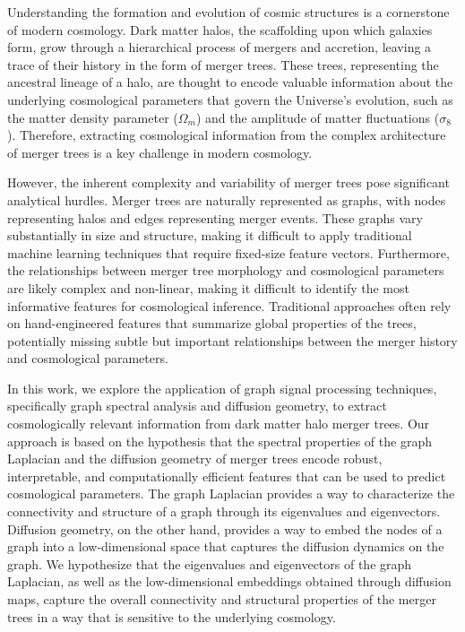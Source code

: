 \documentclass[twocolumn]{aastex631}
\begin{document}
Understanding the formation and evolution of cosmic structures is a cornerstone of modern cosmology. Dark matter halos, the scaffolding upon which galaxies form, grow through a hierarchical process of mergers and accretion, leaving a trace of their history in the form of merger trees. These trees, representing the ancestral lineage of a halo, are thought to encode valuable information about the underlying cosmological parameters that govern the Universe's evolution, such as the matter density parameter ($\Omega_m$) and the amplitude of matter fluctuations ($\sigma_8$). Therefore, extracting cosmological information from the complex architecture of merger trees is a key challenge in modern cosmology.

However, the inherent complexity and variability of merger trees pose significant analytical hurdles. Merger trees are naturally represented as graphs, with nodes representing halos and edges representing merger events. These graphs vary substantially in size and structure, making it difficult to apply traditional machine learning techniques that require fixed-size feature vectors. Furthermore, the relationships between merger tree morphology and cosmological parameters are likely complex and non-linear, making it difficult to identify the most informative features for cosmological inference. Traditional approaches often rely on hand-engineered features that summarize global properties of the trees, potentially missing subtle but important relationships between the merger history and cosmological parameters.

In this work, we explore the application of graph signal processing techniques, specifically graph spectral analysis and diffusion geometry, to extract cosmologically relevant information from dark matter halo merger trees. Our approach is based on the hypothesis that the spectral properties of the graph Laplacian and the diffusion geometry of merger trees encode robust, interpretable, and computationally efficient features that can be used to predict cosmological parameters. The graph Laplacian provides a way to characterize the connectivity and structure of a graph through its eigenvalues and eigenvectors. Diffusion geometry, on the other hand, provides a way to embed the nodes of a graph into a low-dimensional space that captures the diffusion dynamics on the graph. We hypothesize that the eigenvalues and eigenvectors of the graph Laplacian, as well as the low-dimensional embeddings obtained through diffusion maps, capture the overall connectivity and structural properties of the merger trees in a way that is sensitive to the underlying cosmology.
\end{document}
